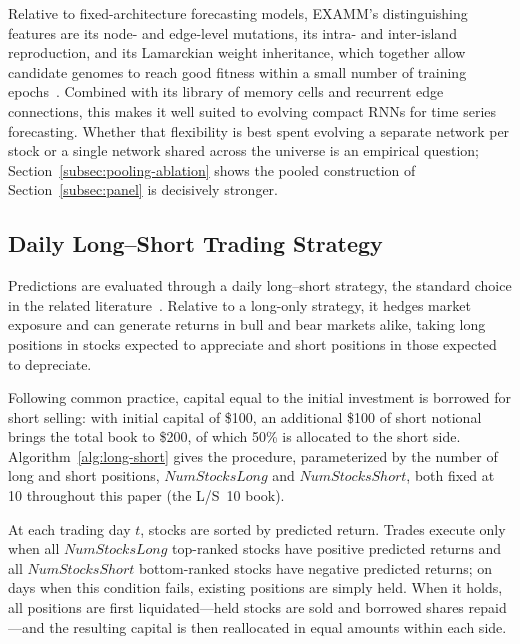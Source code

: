 Relative to fixed-architecture forecasting models, EXAMM's distinguishing features are its node- and edge-level mutations, its intra- and inter-island reproduction, and its Lamarckian weight inheritance, which together allow candidate genomes to reach good fitness within a small number of training epochs~\cite{lyu2021experimental}. Combined with its library of memory cells and recurrent edge connections, this makes it well suited to evolving compact RNNs for time series forecasting. Whether that flexibility is best spent evolving a separate network per stock or a single network shared across the universe is an empirical question; Section~\ref{subsec:pooling-ablation} shows the pooled construction of Section~\ref{subsec:panel} is decisively stronger.

\subsection{Daily Long--Short Trading Strategy}
\label{subsec:trading}

Predictions are evaluated through a daily long--short strategy, the standard choice in the related literature~\cite{park2020intelligent, hou2020enriched}. Relative to a long-only strategy, it hedges market exposure and can generate returns in bull and bear markets alike, taking long positions in stocks expected to appreciate and short positions in those expected to depreciate.

Following common practice, capital equal to the initial investment is borrowed for short selling: with initial capital of \$100, an additional \$100 of short notional brings the total book to \$200, of which 50\% is allocated to the short side. Algorithm~\ref{alg:long-short} gives the procedure, parameterized by the number of long and short positions, $NumStocksLong$ and $NumStocksShort$, both fixed at 10 throughout this paper (the L/S~10 book).

At each trading day $t$, stocks are sorted by predicted return. Trades execute only when all $NumStocksLong$ top-ranked stocks have positive predicted returns and all $NumStocksShort$ bottom-ranked stocks have negative predicted returns; on days when this condition fails, existing positions are simply held. When it holds, all positions are first liquidated---held stocks are sold and borrowed shares repaid---and the resulting capital is then reallocated in equal amounts within each side.

